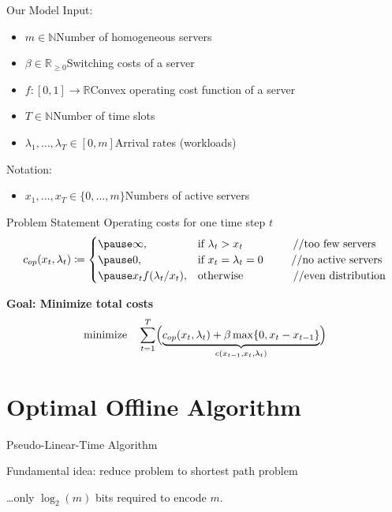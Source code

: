 \documentclass{beamer}
\newcommand{\costs}{c}
\newcommand{\opcosts}{c_{op}}
\newcommand{\fromto}[2]{\{#1,\dotsc,#2\}}
\begin{document}
\begin{frame}{Our Model}
Input:
\begin{itemize}[<+->]
  \item $m\in\mathbb{N}$\dotso Number of homogeneous servers 
  \item $\beta\in\mathbb{R}_{\ge 0}$\dotso Switching costs of a server
  \item $f:[0,1]\rightarrow\mathbb{R}$\dotso Convex operating cost function of a server
  \item $T\in\mathbb{N}$\dotso Number of time slots
  \item $\lambda_1,\dotsc,\lambda_{T}\in[0,m]$\dotso Arrival rates (workloads)
\end{itemize}
\pause[\thebeamerpauses]
Notation:
\begin{itemize}
	\item $x_1,\dotsc,x_{T}\in\fromto{0}{m}$\dotso Numbers of active servers
\end{itemize}
\end{frame}
\begin{frame}{Problem Statement}
Operating costs for one time step $t$
\begin{equation*}
	\opcosts(x_t,\lambda_t)\coloneqq\begin{cases}
	  \pause\infty, & \text{if $\lambda_t>x_t$}\hspace{16mm}\text{//too few servers}\\
          \pause 0, & \text{if $x_t=\lambda_t=0$\hspace{9mm}\text{//no active servers}}\\
	  \pause x_tf(\lambda_t/x_t), & \text{otherwise}\hspace{16mm}\text{//even distribution}
	  \end{cases}
\end{equation*}
\pause
\begin{alertbox}
\centering \textbf{Goal: Minimize total costs}
\begin{align*}
	\text{minimize}\quad \sum\limits_{t=1}^{T}\Bigl(\underbrace{\opcosts(x_t,\lambda_t)+\beta\max\{0,x_t-x_{t-1}\}}_{\costs(x_{t-1},x_t,\lambda_t)}\Bigr)
\end{align*}
\end{alertbox}
\end{frame}
\section{Optimal Offline Algorithm}
\begin{frame}{Pseudo-Linear-Time Algorithm}
\centerline{Fundamental idea: reduce problem to shortest path problem}
\pause
\begin{figure}
	
\end{figure}
\pause {}

\pause\ldots only $\log_2(m)$ bits required to encode $m$.
\end{frame}
\end{document}
